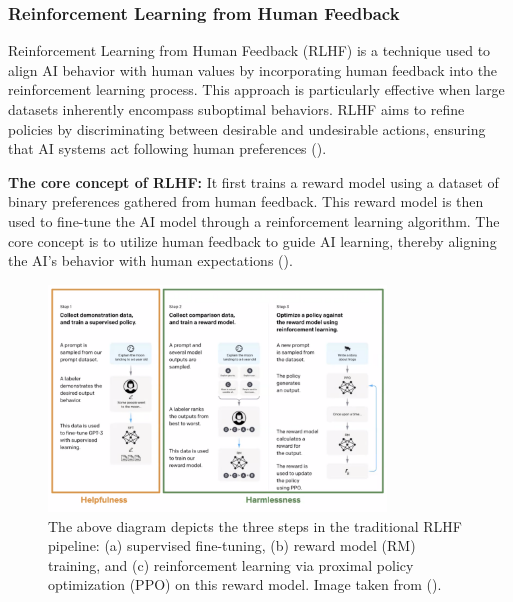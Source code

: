 \documentclass[
  letterpaper,
  DIV=11,
  numbers=noendperiod,
  oneside]{scrreprt}
\theoremstyle{remark}
\begin{document}
\subsubsection{Reinforcement Learning from Human
Feedback}\label{reinforcement-learning-from-human-feedback}

Reinforcement Learning from Human Feedback (RLHF) is a technique used to
align AI behavior with human values by incorporating human feedback into
the reinforcement learning process. This approach is particularly
effective when large datasets inherently encompass suboptimal behaviors.
RLHF aims to refine policies by discriminating between desirable and
undesirable actions, ensuring that AI systems act following human
preferences ().

\textbf{The core concept of RLHF:} It first trains a reward model using
a dataset of binary preferences gathered from human feedback. This
reward model is then used to fine-tune the AI model through a
reinforcement learning algorithm. The core concept is to utilize human
feedback to guide AI learning, thereby aligning the AI's behavior with
human expectations ().

\begin{figure}

{\centering \includegraphics[width=0.8\textwidth,height=\textheight]{src/Figures/rlhf.png}

}

\caption{The above diagram depicts the three steps in the traditional
RLHF pipeline: (a) supervised fine-tuning, (b) reward model (RM)
training, and (c) reinforcement learning via proximal policy
optimization (PPO) on this reward model. Image taken from
().}

\end{figure}%
\end{document}
